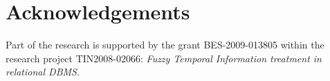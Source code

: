 \documentclass[twocolumn,a4paper]{article}
\theoremstyle{definition}
\begin{document}
\section*{Acknowledgements}
Part of the research is supported by the grant BES-2009-013805 within the research project TIN2008-02066: \emph{Fuzzy Temporal Information treatment in relational DBMS}.




% 
% 
% 
% 
% 
% 
% 
% 
% 
\end{document}
